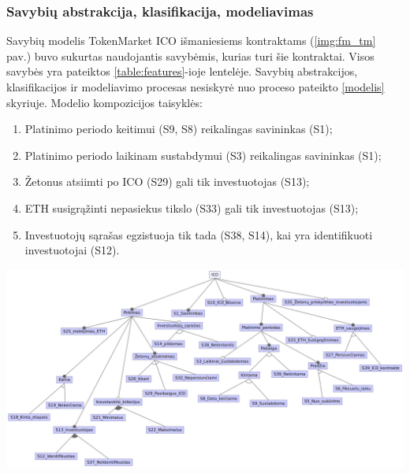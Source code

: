 \documentclass{VUMIFPSbakalaurinis}
\begin{document}
\subsubsection{Savybių abstrakcija, klasifikacija, modeliavimas}

Savybių modelis TokenMarket ICO išmaniesiems kontraktams (\ref{img:fm_tm} pav.) buvo sukurtas naudojantis savybėmis, kurias turi šie kontraktai. Visos savybės yra pateiktos \ref{table:features}-ioje lentelėje. Savybių abstrakcijos, klasifikacijos ir modeliavimo procesas nesiskyrė nuo proceso pateikto \ref{modelis} skyriuje. Modelio kompozicijos taisyklės:
\begin{enumerate}[topsep=0pt,itemsep=-1ex,partopsep=1ex,parsep=1ex]
\item Platinimo periodo keitimui (S9, S8) reikalingas savininkas (S1);
\item Platinimo periodo laikinam sustabdymui (S3) reikalingas savininkas (S1);
\item Žetonus atsiimti po ICO (S29) gali tik investuotojas (S13);
\item ETH susigrąžinti nepasiekus tikslo (S33) gali tik investuotojas (S13);
\item Investuotojų sąrašas egzistuoja tik tada (S38, S14), kai yra identifikuoti investuotojai (S12).
\end{enumerate}

\pagebreak

\begin{landscape}

\begin{center}
    \includegraphics[scale=0.7]{img/tm_feature_model}
    \label{img:fm_tm}
\end{center}

\end{landscape}
\end{document}
